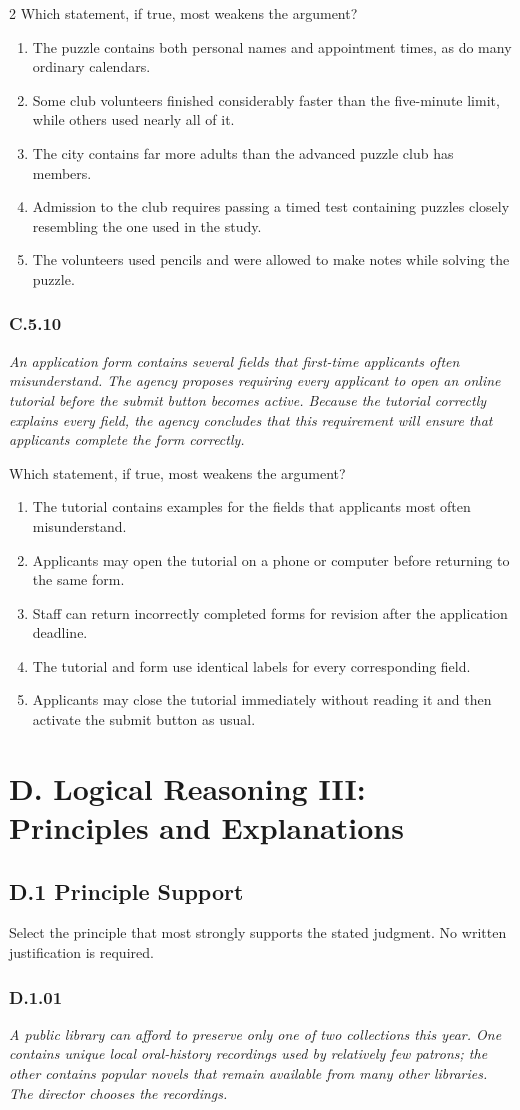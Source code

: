 \documentclass[10pt]{extarticle}
\newcommand{\choice}[1]{\item #1}
\newcommand{\bankitem}[1]{\subsubsection*{#1}}
\begin{document}
\begin{multicols}{2}
Which statement, if true, most weakens the argument?
\begin{enumerate}[label=(\alph*)]
  \choice{The puzzle contains both personal names and appointment times, as do many ordinary calendars.}
  \choice{Some club volunteers finished considerably faster than the five-minute limit, while others used nearly all of it.}
  \choice{The city contains far more adults than the advanced puzzle club has members.}
  \choice{Admission to the club requires passing a timed test containing puzzles closely resembling the one used in the study.}
  \choice{The volunteers used pencils and were allowed to make notes while solving the puzzle.}
\end{enumerate}
\bankitem{C.5.10}
\emph{An application form contains several fields that first-time applicants often misunderstand. The agency proposes requiring every applicant to open an online tutorial before the submit button becomes active. Because the tutorial correctly explains every field, the agency concludes that this requirement will ensure that applicants complete the form correctly.}

Which statement, if true, most weakens the argument?
\begin{enumerate}[label=(\alph*)]
  \choice{The tutorial contains examples for the fields that applicants most often misunderstand.}
  \choice{Applicants may open the tutorial on a phone or computer before returning to the same form.}
  \choice{Staff can return incorrectly completed forms for revision after the application deadline.}
  \choice{The tutorial and form use identical labels for every corresponding field.}
  \choice{Applicants may close the tutorial immediately without reading it and then activate the submit button as usual.}
\end{enumerate}
\section*{D. Logical Reasoning III: Principles and Explanations}
\subsection*{D.1 Principle Support}
Select the principle that most strongly supports the stated judgment. No written justification is required.
\bankitem{D.1.01}
\emph{A public library can afford to preserve only one of two collections this year. One contains unique local oral-history recordings used by relatively few patrons; the other contains popular novels that remain available from many other libraries. The director chooses the recordings.}


\end{multicols}
\end{document}

